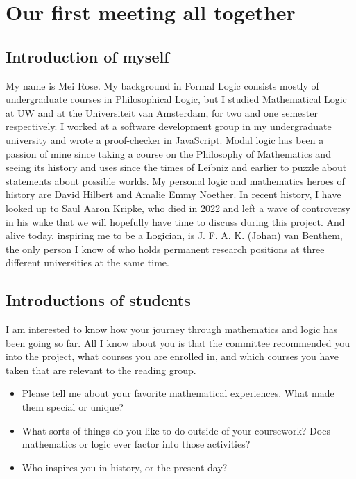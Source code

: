 \chapter{Our first meeting all together}

\setcounter{section}{-1}
\section{Introduction of myself}
My name is Mei Rose. 
My background in Formal Logic consists mostly of undergraduate courses in Philosophical Logic, but I studied Mathematical Logic at UW and 
at the Universiteit van Amsterdam, for two and one semester respectively. I worked at a software development group in my undergraduate university 
and wrote a proof-checker in JavaScript. Modal logic has been a passion of mine since taking a course on the Philosophy of Mathematics
and seeing its history and uses since the times of Leibniz and earlier to puzzle about statements about possible worlds. My personal 
logic and mathematics heroes of history are David Hilbert and Amalie Emmy Noether. In recent history, I have looked up to Saul Aaron Kripke, 
who died in 2022 and left a wave of controversy in his wake that we will hopefully have time to discuss during this project. And alive today, 
inspiring me to be a Logician, is J. F. A. K. (Johan) van Benthem, the only person I know of who holds permanent research positions 
at three different universities at the same time.

\section{Introductions of students}
I am interested to know how your journey through mathematics and logic has been going so far. 
All I know about you is that the committee recommended you into the project, what courses you are enrolled in, 
and which courses you have taken that are relevant to the reading group. 
\begin{itemize}
    \item Please tell me about your favorite mathematical experiences. What made them special or unique?
    \item What sorts of things do you like to do outside of your coursework? Does mathematics or logic ever factor into those activities? 
    \item Who inspires you in history, or the present day?
\end{itemize}

